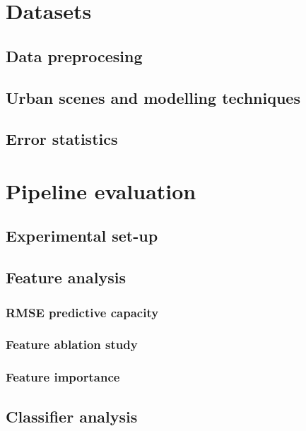 \minitoc
\section{Datasets}
    \subsection{Data preprocesing}
    \subsection{Urban scenes and modelling techniques}
    \subsection{Error statistics}
\section{Pipeline evaluation}
    \subsection{Experimental set-up}
    \subsection{Feature analysis}
        \subsubsection{RMSE predictive capacity}
        \subsubsection{Feature ablation study}
        \subsubsection{Feature importance}
    \subsection{Classifier analysis}
